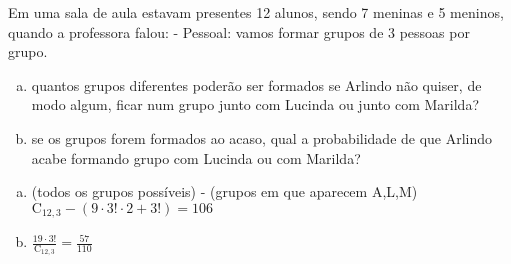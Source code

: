 \begin{ex}
 Em uma sala de aula estavam presentes 12 alunos, sendo 7 meninas e 5 meninos, quando a professora falou:
- Pessoal: vamos formar grupos de 3 pessoas por grupo.
    \begin{enumerate}[(a)]
    \item quantos grupos diferentes poderão ser formados se Arlindo não quiser, de modo algum, ficar num grupo junto com Lucinda ou junto com Marilda?
    \item se os grupos forem formados ao acaso, qual a probabilidade de que Arlindo acabe formando grupo com Lucinda ou com Marilda?
    \end{enumerate}
      \begin{sol}
          \phantom{A} 
        \begin{enumerate} [(a)]
            \item (todos os grupos possíveis) - (grupos em que aparecem A,L,M) \\
            $\mathrm{C}_{{12},3}-(9\cdot3!\cdot2+3!)=106$
            
            \item $\frac{19\cdot3!}{\mathrm{C}_{{12},3}}=\frac{57}{110}$
        \end{enumerate}
      \end{sol}
\end{ex}